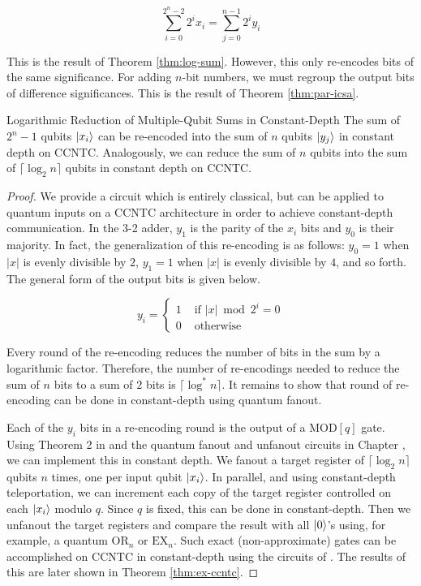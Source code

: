 \begin{equation}
\sum_{i=0}^{2^n - 2} 2^i x_i = \sum_{j=0}^{n-1} 2^i y_i
\end{equation}

This is the result of Theorem \ref{thm:log-sum}.
However, this only re-encodes bits of the same significance. For adding
$n$-bit numbers, we must regroup the output bits of difference
significances. This is the result of Theorem \ref{thm:par-icsa}.

\begin{theorem}{Logarithmic Reduction of Multiple-Qubit Sums in Constant-Depth}
The sum of $2^n -1$ qubits $\left\vert{x_i}\right\rangle$
can be re-encoded into the sum of $n$ qubits $\left\vert{y_j}\right\rangle$ in
constant depth on CCNTC. Analogously, we can reduce the sum of
$n$ qubits into the sum of $\lceil \log_2 n \rceil$ qubits in
constant depth on CCNTC.
\label{thm:log-sum}
\end{theorem}

\begin{proof}
We provide a circuit which is entirely classical, but can be applied to
quantum inputs on a CCNTC architecture in order to achieve
constant-depth communication.
In the 3-2 adder, $y_1$ is the parity of the $x_i$ bits and
$y_0$ is their majority. In fact, the 
generalization of this re-encoding is as follows:
$y_0=1$ when $|x|$ is evenly divisible by $2$, $y_1=1$ when
$|x|$ is evenly divisible by $4$, and so forth. The general
form of the output bits is given below.

\begin{equation}
y_i = \left\{
\begin{array}{rl}
1 & \text{ if } |x| \bmod 2^i = 0 \\
0 & \text{ otherwise } 
\end{array} \right.
\end{equation}

Every round of the re-encoding reduces the number of bits in the
sum by a logarithmic factor. Therefore, the number of re-encodings
needed to reduce the sum of $n$ bits to a sum of $2$ bits is
$\lceil \log^*n \rceil$. It remains to show that round of re-encoding
can be done in constant-depth using quantum fanout.

Each of the $y_i$ bits in a re-encoding round is the output of a
$\text{MOD}[q]$ gate. Using Theorem 2 in \cite{Hoyer2002} and the
quantum fanout and unfanout circuits in Chapter \cite{chap:factor-polylog},
we can
implement this in constant depth. We fanout a target register of
$\lceil \log_2 n \rceil$ qubits $n$ times, one per input qubit $\left\vert{x_i}\right\rangle$.
In parallel, and using constant-depth teleportation, we can increment
each copy of the target register controlled on each $\left\vert{x_i}\right\rangle$ modulo
$q$. Since $q$ is fixed, this can be done in constant-depth. Then
we unfanout the target registers and compare the result with all $\left\vert{0}\right\rangle$'s
using, for example, a quantum $\text{OR}_n$ or $\text{EX}_n$. Such exact
(non-approximate) gates can be accomplished on CCNTC in constant-depth
using the circuits of \cite{Takahashi2011}. The results of this are later shown
in Theorem \ref{thm:ex-ccntc}.
\end{proof}

